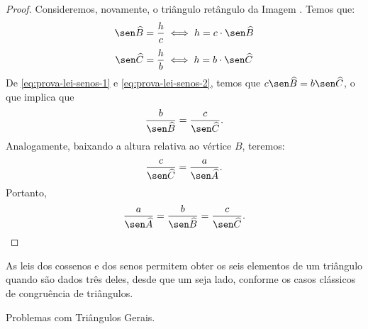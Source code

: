 \begin{proof}
    Consideremos, novamente, o triângulo retângulo da Imagem . %
    Temos que:
    \begin{equation}
    \label{eq:prova-lei-senos-1}
        \sen \widehat B = \frac h c \iff h = c \cdot \sen \widehat B
    \end{equation}
    \begin{equation}
    \label{eq:prova-lei-senos-2}
        \sen \widehat C = \frac h b \iff h = b \cdot \sen \widehat C
    \end{equation}
    De \ref{eq:prova-lei-senos-1} e \ref{eq:prova-lei-senos-2}, temos que $c \sen \widehat B = b \sen \widehat C$,
    o que implica que $$\frac b {\sen \widehat B} = \frac c {\sen \widehat C}.$$ Analogamente, 
    baixando a altura relativa ao vértice $B$, teremos: $$ \frac c {\sen \widehat C} = \frac a {\sen \widehat A}.$$
    Portanto, $$\frac a {\sen \widehat A} = \frac b {\sen \widehat B} = \frac c {\sen \widehat C}.$$
\end{proof}

As leis dos cossenos e dos senos permitem obter os seis elementos de
um triângulo quando são dados três deles, desde que um seja lado,
conforme os casos clássicos de congruência de triângulos.

\begin{onlineact}
    {Problemas com Triângulos Gerais}.
\end{onlineact}